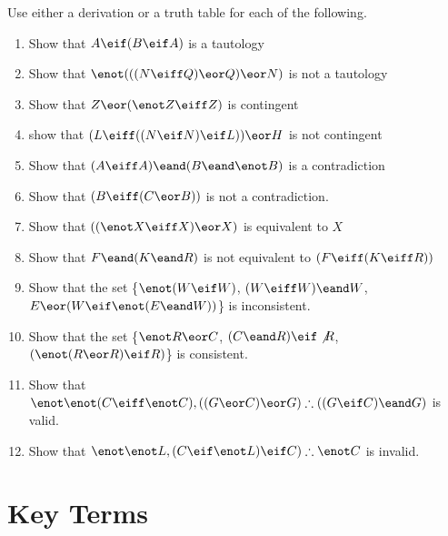 \noindent\problempart Use either a derivation or a truth table for each of the following. 
\begin{enumerate}[label=(\arabic*)]
\item Show that $A \eif (B \eif A)$ is a tautology
\item Show that $\enot (((N \eiff Q) \eor Q) \eor N)$ is not a tautology
\item Show that $ Z \eor (\enot Z \eiff Z) $ is contingent
\item show that $ (L \eiff ((N \eif N) \eif L)) \eor H $ is not contingent
\item Show that $ (A \eiff A) \eand (B \eand \enot B)$ is a contradiction
\item Show that $ (B \eiff (C \eor B)) $ is not a contradiction.
\item Show that $ ((\enot X \eiff X) \eor X) $ is equivalent to $X$
\item Show that $F \eand (K \eand R) $ is not equivalent to $ (F \eiff (K \eiff R)) $
\item Show that the set \{$ \enot (W \eif W)$, $(W \eiff W) \eand W$, $E \eor (W \eif \enot (E \eand W))$\} is inconsistent.
\item Show that the set  \{$\enot R \eor C $, $(C \eand R) \eif \not R$, $(\enot (R \eor R) \eif R) $\} is consistent.
\item Show that $\enot \enot (C \eiff \enot C), ((G \eor C) \eor G) \therefore ((G \eif C) \eand G) $ is valid.
\item Show that $ \enot \enot L,  (C \eif \enot L) \eif C) \therefore \enot C$ is invalid. 
\end{enumerate}




\section*{Key Terms}
\begin{multicols}{2}
\begin{sortedlist}
\end{sortedlist}
\end{multicols}


 




